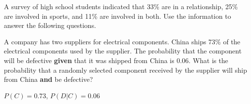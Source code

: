 \documentclass[noanswers]{exam}
\begin{document}
\begin{questions}
\begin{parts}
\end{parts}

\newpage

\question A survey of high school students indicated that 33\% are in a relationship, 25\% are involved in sports, and 11\% are involved in both. Use the information to answer the following questions.

\vspace{3mm}


\question A company has two suppliers for electrical components. China ships 73\% of the electrical components used by the supplier. The probability that the component will be defective \textbf{given} that it was shipped from China is 0.06. What is the probability that a randomly selected component received by the supplier will ship from China \textbf{and} be defective?

\begin{solution}[\stretch{1}]
\vspace{1mm}
$P(C)=0.73$, $P(D|C)=0.06$


\end{solution}
\end{questions}
\end{document}
